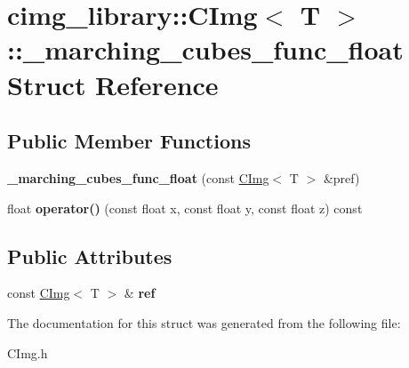 \hypertarget{structcimg__library_1_1_c_img_1_1__marching__cubes__func__float}{\section{cimg\-\_\-library\-:\-:C\-Img$<$ T $>$\-:\-:\-\_\-marching\-\_\-cubes\-\_\-func\-\_\-float Struct Reference}
\label{structcimg__library_1_1_c_img_1_1__marching__cubes__func__float}
}
\subsection*{Public Member Functions}
\begin{DoxyCompactItemize}
\item 
\hypertarget{structcimg__library_1_1_c_img_1_1__marching__cubes__func__float_ac427be16bcdf8a7ca079446edaf801dd}{{\bfseries \-\_\-marching\-\_\-cubes\-\_\-func\-\_\-float} (const \hyperlink{structcimg__library_1_1_c_img}{C\-Img}$<$ T $>$ \&pref)}\label{structcimg__library_1_1_c_img_1_1__marching__cubes__func__float_ac427be16bcdf8a7ca079446edaf801dd}

\item 
\hypertarget{structcimg__library_1_1_c_img_1_1__marching__cubes__func__float_afaa800eb8dccc82cce111d6bae63cc16}{float {\bfseries operator()} (const float x, const float y, const float z) const }\label{structcimg__library_1_1_c_img_1_1__marching__cubes__func__float_afaa800eb8dccc82cce111d6bae63cc16}

\end{DoxyCompactItemize}
\subsection*{Public Attributes}
\begin{DoxyCompactItemize}
\item 
\hypertarget{structcimg__library_1_1_c_img_1_1__marching__cubes__func__float_a90dce72fbf8ec28b439dce439bb5b0c1}{const \hyperlink{structcimg__library_1_1_c_img}{C\-Img}$<$ T $>$ \& {\bfseries ref}}\label{structcimg__library_1_1_c_img_1_1__marching__cubes__func__float_a90dce72fbf8ec28b439dce439bb5b0c1}

\end{DoxyCompactItemize}


The documentation for this struct was generated from the following file\-:\begin{DoxyCompactItemize}
\item 
C\-Img.\-h\end{DoxyCompactItemize}
